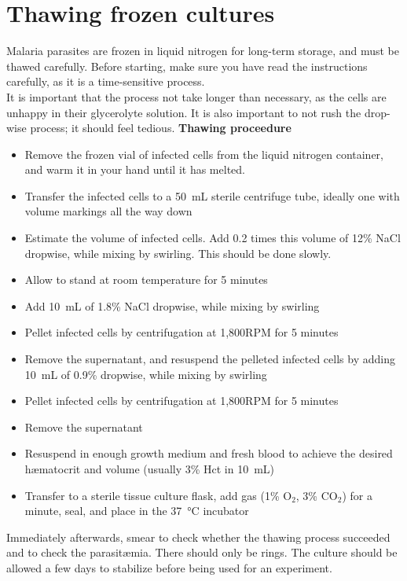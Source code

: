 \documentclass{article}
\begin{document}
\section{Thawing frozen cultures}

Malaria parasites are frozen in liquid nitrogen for long-term storage, and must be thawed carefully. Before starting, make sure you have read the instructions carefully, as it is a time-sensitive process.\\

It is important that the process not take longer than necessary, as the cells are unhappy in their glycerolyte solution. It is also important to not rush the drop-wise process; it should feel tedious.
\textbf{Thawing proceedure}

\begin{itemize}
	\item Remove the frozen vial of infected cells from the liquid nitrogen container, and warm it in your hand until it has melted.
	\item Transfer the infected cells to a \SI{50}{mL} sterile centrifuge tube, ideally one with volume markings all the way down
	\item Estimate the volume of infected cells. Add 0.2 times this volume of 12\% NaCl dropwise, while mixing by swirling. This should be done slowly.
	\item Allow to stand at room temperature for 5 minutes
	\item Add \SI{10}{mL} of 1.8\% NaCl dropwise, while mixing by swirling
	\item Pellet infected cells by centrifugation at 1,800RPM for 5 minutes
	\item Remove the supernatant, and resuspend the pelleted infected cells by adding \SI{10}{mL} of 0.9\% dropwise, while mixing by swirling
	\item Pellet infected cells by centrifugation at 1,800RPM for 5 minutes
	\item Remove the supernatant
	\item Resuspend in enough growth medium and fresh blood to achieve the desired h{\ae}matocrit and volume (usually 3\% Hct in \SI{10}{mL})
	\item Transfer to a sterile tissue culture flask, add gas (1\% O$_2$, 3\% CO$_2$) for a minute, seal, and place in the \SI{37}{\celsius} incubator
\end{itemize}

Immediately afterwards, smear to check whether the thawing process succeeded and to check the parasit{\ae}mia. There should only be rings. The culture should be allowed a few days to stabilize before being used for an experiment.
\end{document}
